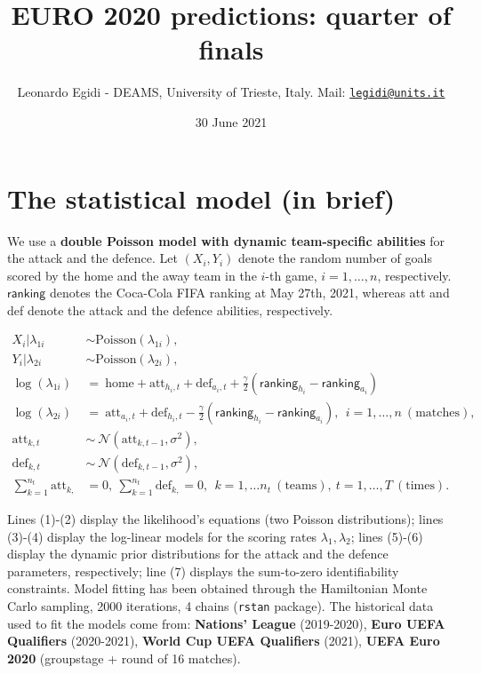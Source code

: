 \documentclass[10pt,]{article}
\title{EURO 2020 predictions: quarter of finals}
\author{Leonardo Egidi - DEAMS, University of Trieste, Italy. Mail:
\href{mailto:legidi@units.it}{\nolinkurl{legidi@units.it}}}
\institute{University of Trieste}
\date{30 June 2021}
\begin{document}
\maketitle

{
\setcounter{tocdepth}{2}
\tableofcontents
}
\section{The statistical model (in
brief)}\label{the-statistical-model-in-brief}

We use a \textbf{double Poisson model with dynamic team-specific
abilities} for the attack and the defence. Let \((X_{i}, Y_{i})\) denote
the random number of goals scored by the home and the away team in the
\(i\)-th game, \(i=1,\ldots,n\), respectively. \(\mathsf{ranking}\)
denotes the Coca-Cola FIFA ranking at May 27th, 2021, whereas att and
def denote the attack and the defence abilities, respectively.

\begin{align}
X_i| \lambda_{1i} &\sim \text{Poisson}(\lambda_{1i}),\\
Y_i|\lambda_{2i} &\sim \text{Poisson}(\lambda_{2i}),  \\
\log(\lambda_{1i}) &=\  \text{home} + \text{att}_{h_i, t}+ \text{def}_{a_i,t} + \frac{\gamma}{2}(\mathsf{ranking}_{h_i}-\mathsf{ranking}_{a_i}) \\
\log(\lambda_{2i}) & =\    \text{att}_{a_i,t} + \text{def}_{h_i,t} - \frac{\gamma}{2}(\mathsf{ranking}_{h_i}-\mathsf{ranking}_{a_i}), \ \ i=1,\ldots,n\ (\text{matches}), \\
\text{att}_{k, t} &\sim \ \mathcal{N}(\text{att}_{k, t-1}, \sigma^2), \\
\text{def}_{k, t} &\sim \  \mathcal{N}(\text{def}_{k, t-1}, \sigma^2),\\
\sum_{k=1}^{n_t} \text{att}_{k, }&=0, \  \sum_{k=1}^{n_t}\text{def}_{k, }=0, \ \ k=1,\ldots n_t \ (\text{teams}), \  t=1,\ldots, T \ (\text{times}).
\label{eq:scoring_rue}
\end{align}

Lines (1)-(2) display the likelihood's equations (two Poisson
distributions); lines (3)-(4) display the log-linear models for the
scoring rates \(\lambda_{1}, \lambda_{2}\); lines (5)-(6) display the
dynamic prior distributions for the attack and the defence parameters,
respectively; line (7) displays the sum-to-zero identifiability
constraints. Model fitting has been obtained through the Hamiltonian
Monte Carlo sampling, 2000 iterations, 4 chains (\texttt{rstan}
package). The historical data used to fit the models come from:
\textbf{Nations' League} (2019-2020), \textbf{Euro UEFA Qualifiers}
(2020-2021), \textbf{World Cup UEFA Qualifiers} (2021), \textbf{UEFA
Euro 2020} (groupstage + round of 16 matches).
\end{document}

